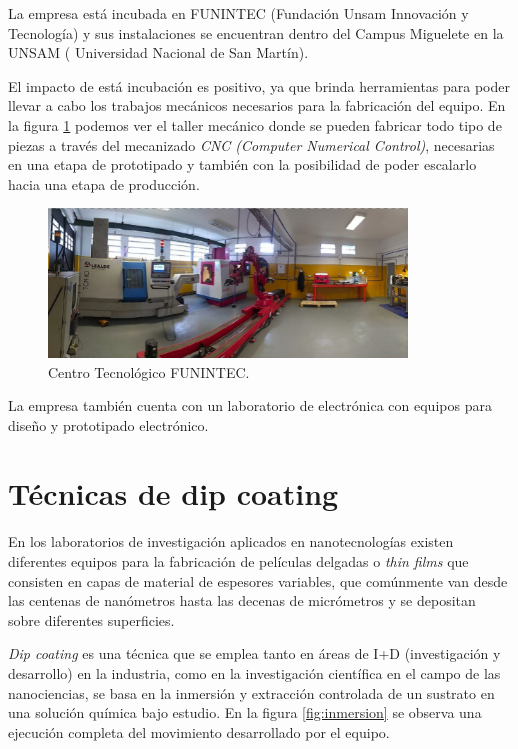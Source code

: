 La empresa está incubada en FUNINTEC (Fundación Unsam Innovación y Tecnología) y sus instalaciones se encuentran dentro del Campus Miguelete en la UNSAM ( Universidad Nacional de San Martín). 

El impacto de está incubación es positivo, ya que brinda herramientas para poder llevar a cabo los trabajos mecánicos necesarios para la fabricación del equipo. En la figura \ref{fig:taller} podemos ver el taller mecánico donde se pueden fabricar todo tipo de piezas a través del mecanizado \textit{CNC (Computer Numerical Control)}, necesarias en una etapa de prototipado y también con la posibilidad de poder escalarlo hacia una etapa de producción. 

\clearpage
\begin{figure}[htpb]
\centering 
\includegraphics[width=0.85\textwidth]{./Figures/taller_v3.pdf}
\caption{Centro Tecnológico FUNINTEC.}
\label{fig:taller}
\end{figure}

La empresa también cuenta con un laboratorio de electrónica con equipos para diseño y prototipado electrónico.

\section{Técnicas de dip coating}

En los laboratorios de investigación aplicados en nanotecnologías existen diferentes equipos para la fabricación de películas delgadas o \textit{thin films} que consisten en capas de material de espesores variables, que comúnmente van desde las centenas de nanómetros hasta las decenas de micrómetros y se depositan sobre diferentes superficies.


\textit{Dip coating} es una técnica que se emplea tanto en áreas de I+D (investigación y desarrollo) en la industria, como en la investigación científica en el campo de las nanociencias, se basa en la inmersión y extracción  controlada de un sustrato en una solución química bajo estudio. En la figura \ref{fig:inmersion} se observa una ejecución completa del movimiento desarrollado por el equipo.



